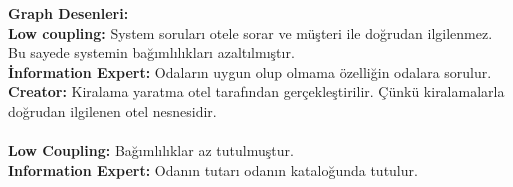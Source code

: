 \documentclass[12pt,a4paper]{report}
\begin{document}
\newpage
{\bf Graph Desenleri:}\\
{\bf Low coupling:} System soruları otele sorar ve müşteri ile doğrudan ilgilenmez. Bu sayede systemin bağımlılıkları azaltılmıştır. \\
{\bf İnformation Expert:} Odaların uygun olup olmama özelliğin odalara sorulur.\\
{\bf Creator:} Kiralama yaratma otel tarafından gerçekleştirilir. Çünkü kiralamalarla doğrudan ilgilenen otel nesnesidir.\\
\\
{\bf Low Coupling:} Bağımlılıklar az tutulmuştur.\\
{\bf Information Expert:} Odanın tutarı odanın kataloğunda tutulur.\\

\newpage
\end{document}
